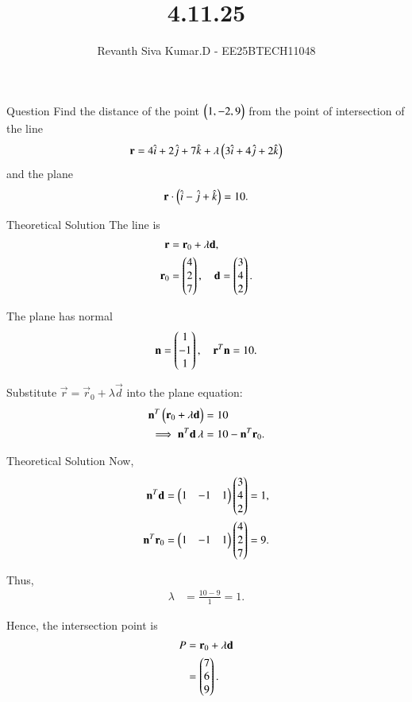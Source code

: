 \documentclass{beamer}
\title %
{4.11.25}
\author %
{Revanth Siva Kumar.D - EE25BTECH11048}
\begin{document}
	
	\frame{\titlepage}
	\begin{frame}{Question}
			Find the distance of the point $\begin{pmatrix}1,-2,9\end{pmatrix}$ from the point of intersection of the line
\[
\mathbf{r} = 4\hat{i} + 2\hat{j} + 7\hat{k} + \lambda \begin{pmatrix}3\hat{i} + 4\hat{j} + 2\hat{k}\end{pmatrix}
\]
and the plane
\[
\mathbf{r}\cdot\begin{pmatrix}\hat{i} - \hat{j} + \hat{k}\end{pmatrix} = 10.
\]
	\end{frame}
	
	
	\begin{frame}{Theoretical Solution}
			The line is
\begin{align}
    \mathbf{r} &= \mathbf{r}_0 + \lambda \mathbf{d}, \\
    \mathbf{r}_0 &= \begin{pmatrix}4 \\ 2 \\ 7\end{pmatrix}, \quad
    \mathbf{d} = \begin{pmatrix}3 \\ 4 \\ 2\end{pmatrix}.
\end{align}

The plane has normal
\begin{align}
    \mathbf{n} = \begin{pmatrix}1 \\ -1 \\ 1\end{pmatrix}, \quad \mathbf{r}^T \mathbf{n} = 10.
\end{align}

Substitute $\vec{r} = \vec{r}_0 + \lambda \vec{d}$ into the plane equation:
\begin{align}
    \mathbf{n}^T\begin{pmatrix}\mathbf{r}_0 + \lambda \mathbf{d}\end{pmatrix} &= 10 \\
    \implies \mathbf{n}^T\mathbf{d}\,\lambda &= 10 - \mathbf{n}^T\mathbf{r}_0.
\end{align}
\end{frame}
\begin{frame}{Theoretical Solution}
Now,
\begin{align}
    \mathbf{n}^T\mathbf{d} &= \begin{pmatrix}1 & -1 & 1\end{pmatrix}\begin{pmatrix}3 \\ 4 \\ 2\end{pmatrix} = 1, \\
    \mathbf{n}^T\mathbf{r}_0 &= \begin{pmatrix}1 & -1 & 1\end{pmatrix}\begin{pmatrix}4 \\ 2 \\ 7\end{pmatrix} = 9.
\end{align}

Thus,
\begin{align}
    \lambda &= \frac{10-9}{1} = 1.
\end{align}

Hence, the intersection point is
\begin{align}
    P &= \mathbf{r}_0 + \lambda \mathbf{d} \\
     &= \begin{pmatrix}7 \\ 6 \\ 9\end{pmatrix}.
\end{align}
\end{frame}
\end{document}
